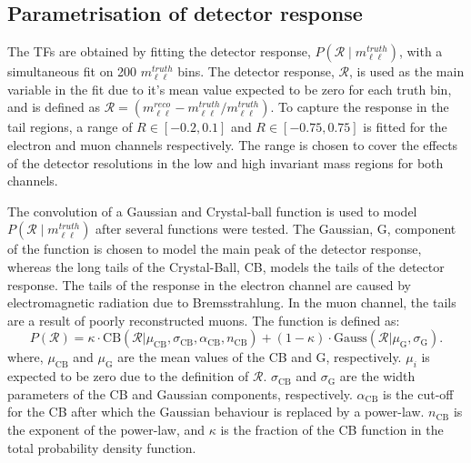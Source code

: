 \subsection{Parametrisation of detector response}
The TFs are obtained by fitting the detector response, $P(\mathcal{R} \mid m_{\ell\ell}^{truth})$, with a simultaneous fit on 200 $m_{\ell\ell}^{truth}$ bins. The detector response, $\mathcal{R}$, is used as the main variable in the fit due to it's mean value expected to be zero for each truth bin, and is defined as $\mathcal{R} = (m_{\ell\ell}^{reco} - m_{\ell\ell}^{truth}/ m_{\ell\ell}^{truth})$. To capture the response in the tail regions, a range of $R \in [-0.2,0.1]$ and $R \in [-0.75,0.75]$ is fitted for the electron and muon channels respectively. The range is chosen to cover the effects of the detector resolutions in the low and high invariant mass regions for both channels. 

The convolution of a Gaussian and Crystal-ball function is used to model $P(\mathcal{R} \mid m_{\ell\ell}^{truth})$ after several functions were tested. The Gaussian, G, component of the function is chosen to model the main peak of the detector response, whereas the long tails of the Crystal-Ball, CB, models the tails of the detector response. The tails of the response in the electron channel are caused by electromagnetic radiation due to Bremsstrahlung. In the muon channel, the tails are a result of poorly reconstructed muons. The function is defined as: 
\begin{equation}\label{eq:TF_responseParam}
    P(\mathcal{R}) = \kappa \cdot \mathrm{CB}(\mathcal{R}| \mu_\mathrm{CB}, \sigma_\mathrm{CB}, \alpha_\mathrm{CB}, n_\mathrm{CB}) + (1 - \kappa) \cdot \mathrm{Gauss}(\mathcal{R}| \mu_\mathrm{G}, \sigma_\mathrm{G}).
\end{equation}
where,  $\mu_\mathrm{CB}$ and $\mu_\mathrm{G}$ are the mean values of the CB and G, respectively. $\mu_i$ is expected to be zero due to the definition of $\mathcal{R}$. $\sigma_\mathrm{CB}$ and $\sigma_\mathrm{G}$ are the width parameters of the CB and Gaussian components, respectively. $\alpha_\mathrm{CB}$ is the cut-off for the CB after which the Gaussian behaviour is replaced by a power-law. $n_\mathrm{CB}$ is the exponent of the power-law, and $\kappa$ is the fraction of the CB function in the total probability density function.


